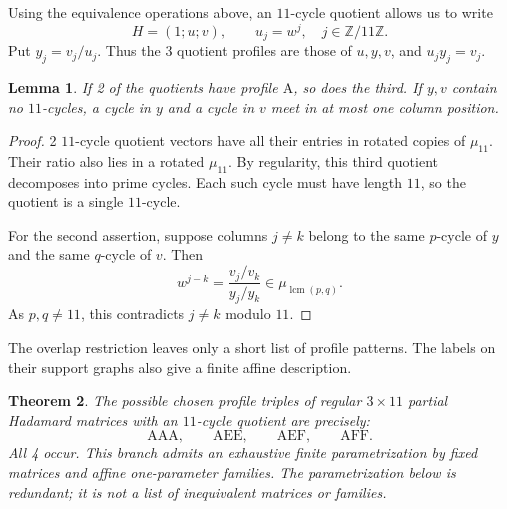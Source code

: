 \documentclass[11pt,a4paper]{article}
\newtheorem{theorem}{Theorem}[section]
\newtheorem{lemma}[theorem]{Lemma}
\theoremstyle{plain}
\theoremstyle{definition}
\theoremstyle{plain}
\begin{document}
Using the equivalence operations above, an $11$-cycle quotient allows us to write
$$H=(1;u;v),\qquad u_j=w^{j},\quad j\in\mathbb{Z}/11\mathbb{Z}.$$
Put $y_j=v_j/u_j$. Thus the 3 quotient profiles are those of $u,y,v$, and $u_j y_j=v_j$.

\par\addvspace{\medskipamount}\noindent
\begin{minipage}{\linewidth}
\begin{lemma}\label{n11_A_branch:overlap}
If 2 of the quotients have profile $\mathrm{A}$, so does the third. If $y,v$ contain no $11$-cycles, a cycle in $y$ and a cycle in $v$ meet in at most one column position.
\end{lemma}
\end{minipage}
\par\addvspace{\medskipamount}

\begin{proof}
2 $11$-cycle quotient vectors have all their entries in rotated copies of $\mu_{11}$. Their ratio also lies in a rotated $\mu_{11}$. By regularity, this third quotient decomposes into prime cycles. Each such cycle must have length $11$, so the quotient is a single $11$-cycle.

For the second assertion, suppose columns $j\ne k$ belong to the same $p$-cycle of $y$ and the same $q$-cycle of $v$. Then
$$w^{j-k}=\frac{v_j/v_k}{y_j/y_k}\in\mu_{\operatorname{lcm}(p,q)}.$$
As $p,q\ne11$, this contradicts $j\ne k$ modulo $11$.
\end{proof}

The overlap restriction leaves only a short list of profile patterns. The labels on their support graphs also give a finite affine description.

\par\addvspace{\medskipamount}\noindent
\begin{minipage}{\linewidth}
\begin{theorem}\label{n11_A_branch:profiles}
The possible chosen profile triples of regular $3\times11$ partial Hadamard matrices with an $11$-cycle quotient are precisely:
$$\mathrm{AAA},\qquad \mathrm{AEE},\qquad \mathrm{AEF},\qquad \mathrm{AFF}.$$
All 4 occur. This branch admits an exhaustive finite parametrization by fixed matrices and affine one-parameter families. The parametrization below is redundant; it is not a list of inequivalent matrices or families.
\end{theorem}
\end{minipage}
\par\addvspace{\medskipamount}
\end{document}
